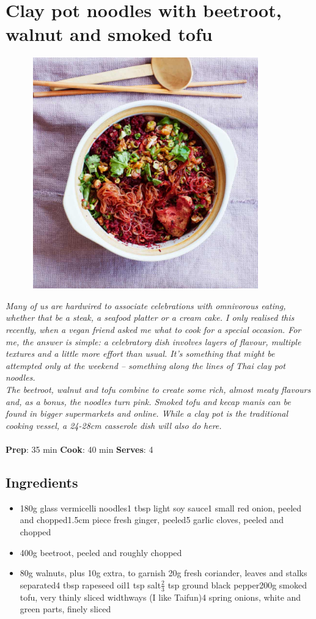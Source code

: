 \documentclass{book}
\begin{document}
\section{Clay pot noodles with beetroot, walnut and smoked tofu}
\begin{figure}
\centering\includegraphics[width=10cm,height=10cm,keepaspectratio]{Recipe_Pictures/Clay_pot_noodles_with_beetroot,_walnut_and_smoked_tofu.png}
\end{figure}
\emph{Many of us are hardwired to associate celebrations with omnivorous eating, whether that be a steak, a seafood platter or a cream cake. I only realised this recently, when a vegan friend asked me what to cook for a special occasion. For me, the answer is simple: a celebratory dish involves layers of flavour, multiple textures and a little more effort than usual. It’s something that might be attempted only at the weekend – something along the lines of Thai clay pot noodles.\\ 
The beetroot, walnut and tofu combine to create some rich, almost meaty flavours and, as a bonus, the noodles turn pink. Smoked tofu and kecap manis can be found in bigger supermarkets and online. While a clay pot is the traditional cooking vessel, a 24-28cm casserole dish will also do here.}\\\\ 
\textbf{Prep}: 35 min
\textbf{Cook}: 40 min
\textbf{Serves}: 4
\subsection*{Ingredients}
\begin{itemize}
\item 180g glass vermicelli noodles1 tbsp light soy sauce1 small red onion, peeled and chopped1.5cm piece fresh ginger, peeled5 garlic cloves, peeled and chopped
\item 400g beetroot, peeled and roughly chopped
\item 80g walnuts, plus 10g extra, to garnish 20g fresh coriander, leaves and stalks separated4 tbsp rapeseed oil1 tsp salt$\frac{2}{3}$ tsp ground black pepper200g smoked tofu, very thinly sliced widthways (I like Taifun)4 spring onions, white and green parts, finely sliced
\end{itemize}
\end{document}
